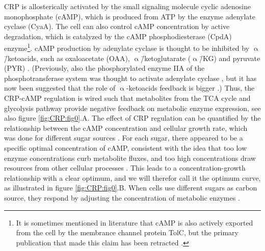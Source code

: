 CRP is allosterically activated by the small signaling molecule cyclic adenosine monophosphate (cAMP), 
which is 
produced from ATP by the enzyme adenylate cyclase (CyaA).
%
The cell can also control cAMP concentration by active degradation, 
which is catalyzed by the 
cAMP phosphodiesterase (CpdA) enzyme\footnote{It is sometimes mentioned in literature that cAMP is also actively exported from the cell by the membrance channel protein TolC, but the primary publication that made this claim has been retracted \cite{Hantke2011}.}.
%
cAMP production by adenylate cyclase is thought to be inhibited by $\upalpha$\=/ketoacids, such as oxaloacetate (OAA), $\upalpha$\=/ketoglutarate ($\upalpha$\=/KG) and pyruvate (PYR) \cite{You2013}.
(Previously, also the phosphorylated enzyme IIA of the phosphotransferase system was thought to activate adenylate cyclase \cite{Keseler2017, Deutscher2008, Gorke2008}, but it has now been suggested that the role of $\upalpha$-ketoacids feedback is bigger \cite{You2013}.)
%
Thus, the CRP-cAMP regulation is wired such that metabolites from the TCA cycle and glycolysis pathway provide negative feedback on metabolic enzyme expression, see also figure \ref{fig:CRP:fig0}.A. 
%
The effect of CRP regulation can be quantified by the relationship between the cAMP concentration and cellular growth rate, 
which was done for different sugar sources \cite{Towbin2017}.
%
For each sugar, there appeared to be a specific optimal concentration of cAMP, consistent with the idea that
%
too low enzyme concentrations curb metabolite fluxes, and too high concentrations draw resources from other cellular processes 
\cite{Jensen1993, Dekel2005, Berkhout2013, Ray2016, Towbin2017, You2013}.
%
This leads to a concentration-growth relationship with a clear optimum, and we will therefor call it the optimum curve, as illustrated in figure \ref{fig:CRP:fig0}.B.
%
%
When cells use different sugars as carbon source, they respond by adjusting the concentration of metabolic enzymes \cite{You2013}.
